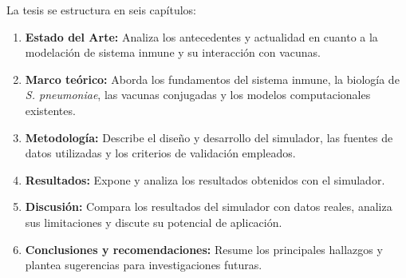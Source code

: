 La tesis se estructura en seis capítulos:
\begin{enumerate}
    \item \textbf{Estado del Arte:} Analiza los antecedentes y actualidad en cuanto a la modelación de sistema inmune y su interacción con vacunas.
    \item \textbf{Marco teórico:} Aborda los fundamentos del sistema inmune, la biología de \textit{S. pneumoniae}, las vacunas conjugadas y los modelos computacionales existentes.
    
    \item \textbf{Metodología:} Describe el diseño y desarrollo del simulador, las fuentes de datos utilizadas y los criterios de validación empleados.
    \item \textbf{Resultados:} Expone y analiza los resultados obtenidos con el simulador.
    \item \textbf{Discusión:} Compara los resultados del simulador con datos reales, analiza sus limitaciones y discute su potencial de aplicación.
    \item \textbf{Conclusiones y recomendaciones:} Resume los principales hallazgos y plantea sugerencias para investigaciones futuras.
\end{enumerate}